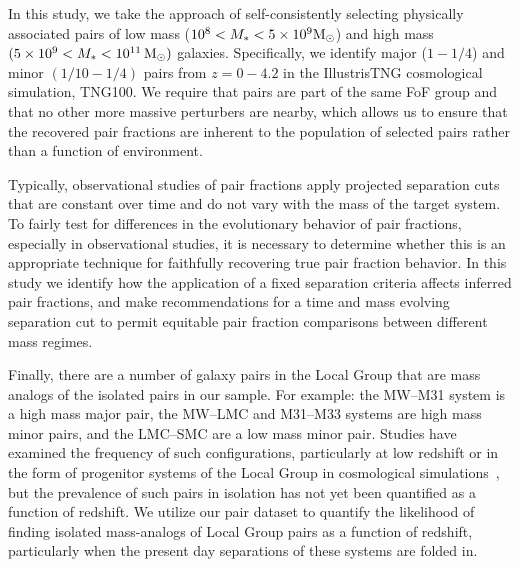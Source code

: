 \documentclass[twocolumn]{aastex631}
\begin{document}
    In this study, we take the approach of self-consistently selecting physically associated pairs of low mass ($10^8<M_*<5\times10^9\mathrm{M}_\odot$) and high mass $(5\times10^9<M_*<10^{11}\,\mathrm{M}_\odot)$ galaxies. 
    Specifically, we identify major ($1-1/4$) and minor $(1/10-1/4)$ pairs from $z=0-4.2$ in the IllustrisTNG cosmological simulation, TNG100. 
    We require that pairs are part of the same FoF group and that no other more massive perturbers are nearby, which allows us to ensure that the recovered pair fractions are inherent to the population of selected pairs rather than a function of environment. 
  
    Typically, observational studies of pair fractions apply projected separation cuts that are constant over time and do not vary with the mass of the target system. 
    To fairly test for differences in the evolutionary behavior of pair fractions, especially in observational studies, it is necessary to determine whether this is an appropriate technique for faithfully recovering true pair fraction behavior.
    In this study we identify how the application of a fixed separation criteria affects inferred pair fractions, and make recommendations for a time and mass evolving separation cut to permit equitable pair fraction comparisons between different mass regimes.
    
    Finally, there are a number of galaxy pairs in the Local Group that are mass analogs of the isolated pairs in our sample.
    For example: the MW--M31 system is a high mass major pair, the MW--LMC and M31--M33 systems are high mass minor pairs, and the LMC--SMC are a low mass minor pair.
    Studies have examined the frequency of such configurations, particularly at low redshift or in the form of progenitor systems of the Local Group in cosmological simulations~\citep{Bk2011,Fattahi2013,Patel2017a-Orbits,Geha2017,Mao2021}, but the prevalence of such pairs in isolation has not yet been quantified as a function of redshift. 
    We utilize our pair dataset to quantify the likelihood of finding isolated mass-analogs of Local Group pairs as a function of redshift, particularly when the present day separations of these systems are folded in. 
    
\end{document}
